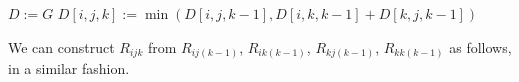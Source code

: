 \documentclass[a4paper]{article}
\begin{document}
\begin{note}
    \begin{algorithmic}[1]
         
        \State $D := G$
        \State $D[i, j, k] := \min(D[i, j, k - 1], D[i, k, k - 1] + D[k, j, k - 1])$
        \EndFor
        \EndFor
        \EndFor
        \EndFunction
    \end{algorithmic}

    \vspace{1em}

    We can construct $R_{ijk}$ from $R_{ij(k-1)}$, $R_{ik(k-1)}$, $R_{kj(k-1)}$, $R_{kk(k-1)}$ as follows, in a similar fashion.\\


\end{note}
\end{document}
